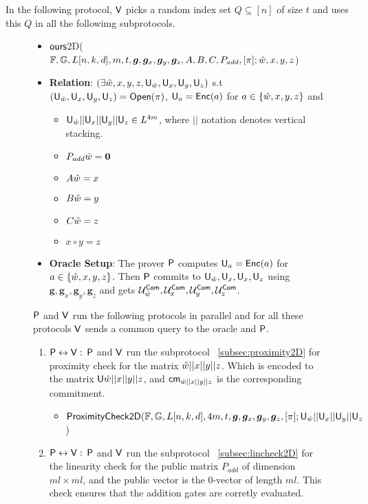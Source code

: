 In the following protocol, $\mathsf{V}$ picks a random index set $Q\subseteq [n]$ of size $t$ and uses this $Q$ in all the followimg subprotocols.
\begin{figure}[h!]
\centering
\begin{framed}
\begin{itemize}
	\item {$\textsf{ours}$2D($\mathbb{F}, \mathbb{G}, L[n,k,d], m, t, \bm{g}, \bm{g}_x, \bm{g}_y, \bm{g}_z, A,B,C, P_{add}, [\pi]; \hat{w}, x, y, z$)}
	\item {\bf Relation}: $(\exists \hat{w}, x, y, z, \mathsf{U}_{\hat{w}}, \mathsf{U}_x, \mathsf{U}_y, \mathsf{U}_z)$ s.t $(\mathsf{U}_{\hat{w}} , \mathsf{U}_x, \mathsf{U}_y, \mathsf{U}_z) = \mathsf{Open}(\pi)$, $\mathsf{U}_a = \mathsf{Enc}(a)$ for $a\in \{\hat{w}, x,y,z\}$ and 
	\begin{itemize}
		\item $\mathsf{U}_{\hat{w}}||\mathsf{U}_x||\mathsf{U}_y||\mathsf{U}_z \in L^{4m}$, where $||$ notation denotes vertical stacking.
		\item $P_{add} \hat{w} = \bm{0}$
		\item $A\hat{w} = x$
		\item $B\hat{w} = y$
		\item $C\hat{w} = z$
		\item $x\circ y = z$
	\end{itemize}
	\item {\bf Oracle Setup}: The prover $\mathsf{P}$ computes $\mathsf{U}_a =\mathsf{Enc}(a)$ for $a\in \{\hat{w},x,y,z\}$. Then $\mathsf{P}$ commits to $\mathsf{U}_{\hat{w}}, \mathsf{U}_x, \mathsf{U}_x, \mathsf{U}_z$ using $\bm{g}, \bm{g}_x, \bm{g}_y, \bm{g}_z$ and gets $\mathcal{U}^{\mathsf{Com}}_{\hat{w}}, \mathcal{U}^{\mathsf{Com}}_{x}, \mathcal{U}^{\mathsf{Com}}_{y}, \mathcal{U}^{\mathsf{Com}}_{z}$.
\end{itemize}
$\mathsf{P}$ and $\mathsf{V}$ run the following protocols in parallel and for all these protocols $\mathsf{V}$ sends a common query to the oracle and $\mathsf{P}$.
\begin{enumerate}
	\item $\mathsf{P} \leftrightarrow \mathsf{V}: $ $\mathsf{P}$ and $\mathsf{V}$ run the subprotocol ~\ref{subsec:proximity2D} for proximity check for the matrix $\hat{w}||x||y||z$. Which is encoded to the matrix $\mathsf{U}{\hat{w}||x||y||z}$, and $\mathsf{cm}_{\hat{w}||x||y||z}$ is the corresponding commitment.
	\begin{itemize}
		\item $\mathsf{ProximityCheck2D}(\mathbb{F}, \mathbb{G}, L[n,k,d], 4m, t, \bm{g}, \bm{g}_x, \bm{g}_y, \bm{g}_z, [\pi]; \mathsf{U}_{\hat{w}}||\mathsf{U}_x||\mathsf{U}_y||\mathsf{U}_z$)
	\end{itemize}
	\item $\mathsf{P} \leftrightarrow \mathsf{V}: $ $\mathsf{P}$ and $\mathsf{V}$ run the subprotocol ~\ref{subsec:lincheck2D} for the linearity check for the public matrix $P_{add}$ of dimension $ml\times ml$, and the public vector is the 0-vector of length $ml$. This check ensures that the addition gates are corretly evaluated.

\end{enumerate}
\end{framed}
\end{figure}
